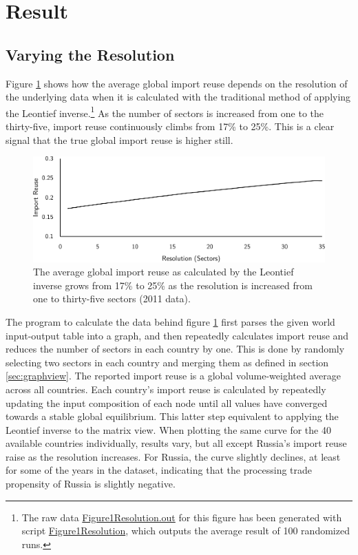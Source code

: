 \documentclass[english]{uzhpub}
\begin{document}
\section{Result}
\label{sec:result}

\subsection{Varying the Resolution}
\label{res:varying}

Figure \ref{fig:varying} shows how the average global import reuse depends on the resolution of the underlying data when it is calculated with the traditional method of applying the Leontief inverse.\footnote{The raw data \href{https://github.com/meisserecon/importreuse/blob/master/src/com/meissereconomics/seminar/run/Figure1Resolution.out}{Figure1Resolution.out} for this figure has been generated with script \href{https://github.com/meisserecon/importreuse/blob/master/src/com/meissereconomics/seminar/run/Figure1Resolution.java}{Figure1Resolution}, which outputs the average result of 100 randomized runs.} As the number of sectors is increased from one to the thirty-five, import reuse continuously climbs from 17\% to 25\%. This is a clear signal that the true global import reuse is higher still.

\begin{figure}
\centering
\includegraphics[scale=0.8]{../results/resolution}
\caption{The average global import reuse as calculated by the Leontief inverse grows from 17\% to 25\% as the resolution is increased from one to thirty-five sectors (2011 data).} \label{fig:varying}
\end{figure}

The program to calculate the data behind figure \ref{fig:varying} first parses the given world input-output table into a graph, and then repeatedly calculates import reuse and reduces the number of sectors in each country by one. This is done by randomly selecting two sectors in each country and merging them as defined in section \ref{sec:graphview}. The reported import reuse is a global volume-weighted average across all countries. Each country's import reuse is calculated by repeatedly updating the input composition of each node until all values have converged towards a stable global equilibrium. This latter step equivalent to applying the Leontief inverse to the matrix view. When plotting the same curve for the 40 available countries individually, results vary, but all except Russia's import reuse raise as the resolution increases. For Russia, the curve slightly declines, at least for some of the years in the dataset, indicating that the processing trade propensity of Russia is slightly negative.
\end{document}
